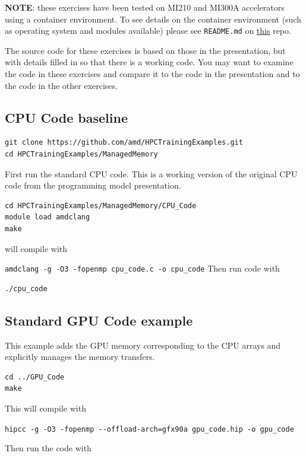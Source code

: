\documentclass[
]{article}
\let\oldtexttt\texttt
\renewcommand{\texttt}[1]{
  \colorbox{Light}{\oldtexttt{#1}}
}
\begin{document}
\textbf{NOTE}: these exercises have been tested on MI210 and MI300A
accelerators using a container environment. To see details on the
container environment (such as operating system and modules available)
please see \texttt{README.md} on
\href{https://github.com/amd/HPCTrainingDock}{this} repo.

The source code for these exercises is based on those in the
presentation, but with details filled in so that there is a working
code. You may want to examine the code in these exercises and compare it
to the code in the presentation and to the code in the other exercises.

\hypertarget{cpu-code-baseline}{%
\subsection{CPU Code baseline}\label{cpu-code-baseline}}

\begin{verbatim}
git clone https://github.com/amd/HPCTrainingExamples.git
cd HPCTrainingExamples/ManagedMemory
\end{verbatim}

First run the standard CPU code. This is a working version of the
original CPU code from the programming model presentation.

\begin{verbatim}
cd HPCTrainingExamples/ManagedMemory/CPU_Code
module load amdclang
make
\end{verbatim}

will compile with
\texttt{amdclang\ -g\ -O3\ -fopenmp\ cpu\_code.c\ -o\ cpu\_code} Then
run code with

\begin{verbatim}
./cpu_code
\end{verbatim}

\hypertarget{standard-gpu-code-example}{%
\subsection{Standard GPU Code example}\label{standard-gpu-code-example}}

This example adds the GPU memory corresponding to the CPU arrays and
explicitly manages the memory transfers.

\begin{verbatim}
cd ../GPU_Code
make
\end{verbatim}

This will compile with
\texttt{hipcc\ -g\ -O3\ -fopenmp\ -\/-offload-arch=gfx90a\ gpu\_code.hip\ -o\ gpu\_code}
Then run the code with
\end{document}
